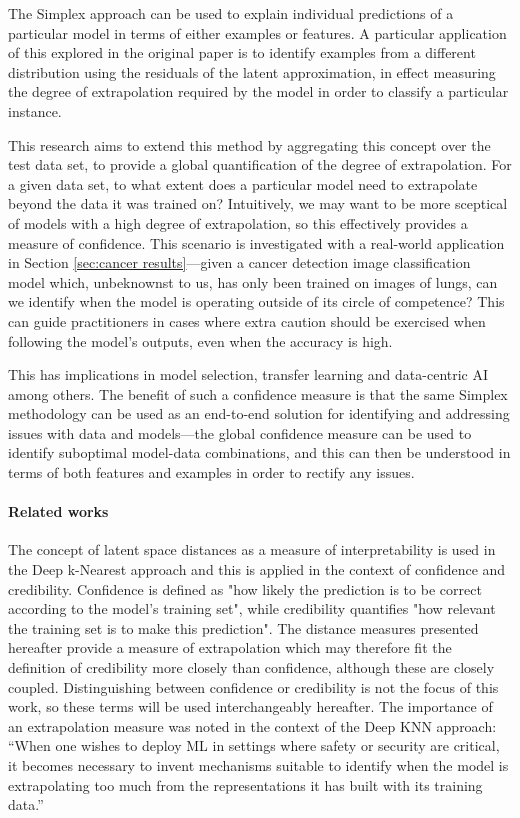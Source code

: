 \documentclass{article}
\begin{document}
The Simplex approach \cite{crabbe_explaining_2021} can be used to explain individual predictions of a particular model in terms of either examples or features. A particular application of this explored in the original paper is to identify examples from a different distribution using the residuals of the latent approximation, in effect measuring the degree of extrapolation required by the model in order to classify a particular instance.

This research aims to extend this method by aggregating this concept over the test data set, to provide a global quantification of the degree of extrapolation. For a given data set, to what extent does a particular model need to extrapolate beyond the data it was trained on? Intuitively, we may want to be more sceptical of models with a high degree of extrapolation, so this effectively provides a measure of confidence. This scenario is investigated with a real-world application in Section \ref{sec:cancer results}---given a cancer detection image classification model which, unbeknownst to us, has only been trained on images of lungs, can we identify when the model is operating outside of its circle of competence? This can guide practitioners in cases where extra caution should be exercised when following the model's outputs, even when the accuracy is high.

This has implications in model selection, transfer learning and data-centric AI among others. The benefit of such a confidence measure is that the same Simplex methodology can be used as an end-to-end solution for identifying and addressing issues with data and models---the global confidence measure can be used to identify suboptimal model-data combinations, and this can then be understood in terms of both features and examples in order to rectify any issues.


\paragraph{Related works}

The concept of latent space distances as a measure of interpretability is used in the Deep k-Nearest approach \cite{papernot_deep_2018} and this is applied in the context of confidence and credibility. Confidence is defined as "how likely the prediction is to be correct according to the model’s training set", while credibility quantifies "how relevant the training set is to make this prediction". The distance measures presented hereafter provide a measure of extrapolation which may therefore fit the definition of credibility more closely than confidence, although these are closely coupled. Distinguishing between confidence or credibility is not the focus of this work, so these terms will be used interchangeably hereafter. The importance of an extrapolation measure was noted in the context of the Deep KNN approach: “When one wishes to deploy ML in settings where safety or security are critical, it becomes necessary to invent mechanisms suitable to identify when the model is extrapolating too much from the representations it has built with its training data.”
\end{document}
